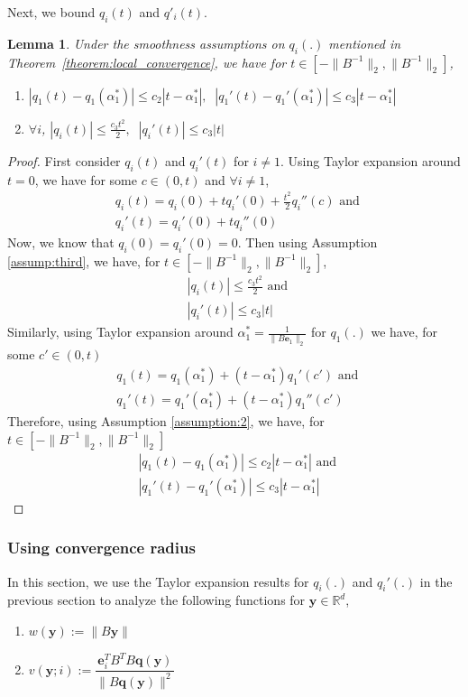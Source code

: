 \documentclass[letterpaper]{article}
\newtheorem{lemma}[theorem]{Lemma}
\newcommand{\ba}[1]{\begin{align}#1\end{align}}
\newcommand{\bas}[1]{\begin{align*}#1\end{align*}}
\newcommand{\by}{\pmb{y}}
\newcommand{\be}{\pmb{e}}
\newcommand{\bb}[1]{\left(#1\right)}
\begin{document}
Next, we bound $q_{i}\bb{t}$ and $q'_{i}\bb{t}$. 
\begin{lemma}
    \label{lemma:q_i_q_i'_bound} Under the smoothness assumptions on $q_{i}(.)$ mentioned in Theorem~\ref{theorem:local_convergence}, we have for $t \in [-\|B^{-1}\|_{2},\|B^{-1}\|_{2}]$, 
    \begin{enumerate}
        \item $\left|q_{1}\bb{t} - q_{1}\bb{\alpha^{*}_{1}}\right| \leq c_{2}\left|t-\alpha^{*}_{1}\right|, \;\; \left|q_{1}'\bb{t} - q_{1}'\bb{\alpha^{*}_{1}}\right| \leq c_{3}\left|t-\alpha^{*}_{1}\right|$
        \item $\forall i$, $|q_{i}\bb{t}| \leq \frac{c_{3}t^{2}}{2}, \;\; |q_{i}'\bb{t}| \leq c_{3}|t|$
    \end{enumerate}
\end{lemma}
\begin{proof}
First consider $q_{i}\bb{t}$ and $q_{i}'\bb{t}$ for $i \neq 1$. Using Taylor expansion around $t = 0$, we have for some $c \in \bb{0,t}$ and $\forall i \neq 1$,
\bas{
    & q_{i}\bb{t} = q_{i}\bb{0} + tq_{i}'\bb{0} + \frac{t^{2}}{2}q_{i}''\bb{c} \text{ and } \\
    & q_{i}'\bb{t} = q_{i}'\bb{0} + tq_{i}''\bb{0}
}
Now, we know that $q_{i}\bb{0} = q_{i}'\bb{0} = 0$. Then using Assumption \ref{assump:third}, we have, for $t \in [-\|B^{-1}\|_{2},\|B^{-1}\|_{2}]$, 
\ba{
    & |q_{i}\bb{t}| \leq \frac{c_{3}t^{2}}{2} \text{ and } \label{eq:taylor_bound_1} \\
    & |q_{i}'\bb{t}| \leq c_{3}|t| \label{eq:taylor_bound_2}
}
Similarly, using Taylor expansion around $\alpha^{*}_{1} = \frac{1}{\|B\be_{1}\|_{2}}$ for $q_{1}\bb{.}$ we have, for some $c' \in \bb{0,t}$
\bas{
    & q_{1}\bb{t} = q_{1}\bb{\alpha^{*}_{1}} + \bb{t-\alpha^{*}_{1}}q_{1}'\bb{c'} \text{ and } \\
    & q_{1}'\bb{t} = q_{1}'\bb{\alpha^{*}_{1}} + \bb{t-\alpha^{*}_{1}}q_{1}''\bb{c'}
}
Therefore, using Assumption \ref{assumption:2}, we have, for $t \in [-\|B^{-1}\|_{2},\|B^{-1}\|_{2}]$
\ba{
    & \left|q_{1}\bb{t} - q_{1}\bb{\alpha^{*}_{1}}\right| \leq c_{2}\left|t-\alpha^{*}_{1}\right| \text{ and } \label{eq:taylor_bound_3} \\
    & \left|q_{1}'\bb{t} - q_{1}'\bb{\alpha^{*}_{1}}\right| \leq c_{3}\left|t-\alpha^{*}_{1}\right| \label{eq:taylor_bound_4}
}
\end{proof}
\subsubsection{Using convergence radius}
In this section, we use the Taylor expansion results for $q_{i}\bb{.}$ and $q_{i}'\bb{.}$ in the previous section to analyze the following functions for $\by \in \mathbb{R}^{d}$,
\begin{enumerate}
    \item $w\bb{\by} := \|B\by\|$
    \item $v\bb{\by;i} := \dfrac{\be_{i}^{T}B^{T}B\bm{q}\bb{\by}}{\|B\bm{q}\bb{\by}\|^{2}}$
\end{enumerate} 
\end{document}
